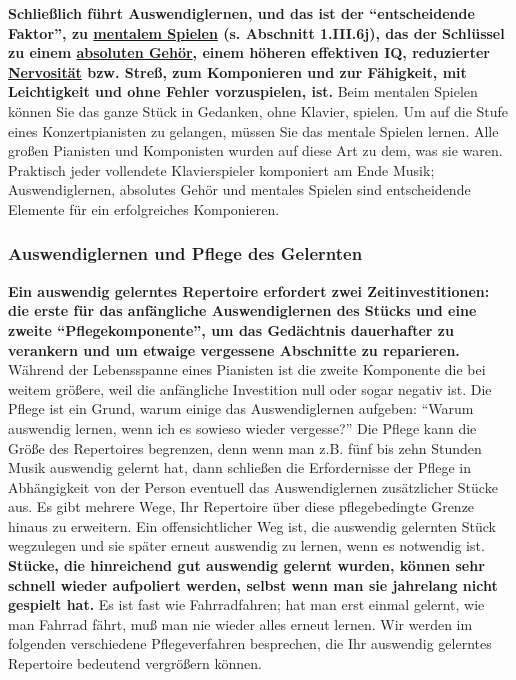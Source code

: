 \textbf{Schließlich führt Auswendiglernen, und das ist der \enquote{entscheidende Faktor}, zu \hyperref[c1iii6tastatur]{mentalem Spielen} (s. Abschnitt 1.III.6j), das der Schlüssel zu einem \hyperref[c1iii12]{absoluten Gehör}, einem höheren effektiven IQ, reduzierter \hyperref[c1iii15]{Nervosität} bzw. Streß, zum Komponieren und zur Fähigkeit, mit Leichtigkeit und ohne Fehler vorzuspielen, ist.}
Beim mentalen Spielen können Sie das ganze Stück in Gedanken, ohne Klavier, spielen.
Um auf die Stufe eines Konzertpianisten zu gelangen, müssen Sie das mentale Spielen lernen.
Alle großen Pianisten und Komponisten wurden auf diese Art zu dem, was sie waren.
Praktisch jeder vollendete Klavierspieler komponiert am Ende Musik; Auswendiglernen, absolutes Gehör und mentales Spielen sind entscheidende Elemente für ein erfolgreiches Komponieren.


\subsubsection{Auswendiglernen und Pflege des Gelernten}
\label{c1iii6c}

\textbf{Ein auswendig gelerntes Repertoire erfordert zwei Zeitinvestitionen: die erste für das anfängliche Auswendiglernen des Stücks und eine zweite \enquote{Pflegekomponente}, um das Gedächtnis dauerhafter zu verankern und um etwaige vergessene Abschnitte zu reparieren.}
Während der Lebensspanne eines Pianisten ist die zweite Komponente die bei weitem größere, weil die anfängliche Investition null oder sogar negativ ist.
Die Pflege ist ein Grund, warum einige das Auswendiglernen aufgeben: \enquote{Warum auswendig lernen, wenn ich es sowieso wieder vergesse?}
Die Pflege kann die Größe des Repertoires begrenzen, denn wenn man z.B. fünf bis zehn Stunden Musik auswendig gelernt hat, dann schließen die Erfordernisse der Pflege in Abhängigkeit von der Person eventuell das Auswendiglernen zusätzlicher Stücke aus.
Es gibt mehrere Wege, Ihr Repertoire über diese pflegebedingte Grenze hinaus zu erweitern.
Ein offensichtlicher Weg ist, die auswendig gelernten Stück wegzulegen und sie später erneut auswendig zu lernen, wenn es notwendig ist.
\textbf{Stücke, die hinreichend gut auswendig gelernt wurden, können sehr schnell wieder aufpoliert werden, selbst wenn man sie jahrelang nicht gespielt hat.}
Es ist fast wie Fahrradfahren; hat man erst einmal gelernt, wie man Fahrrad fährt, muß man nie wieder alles erneut lernen.
Wir werden im folgenden verschiedene Pflegeverfahren besprechen, die Ihr auswendig gelerntes Repertoire bedeutend vergrößern können. 

